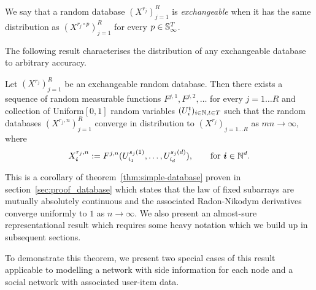 
\begin{definition}
We say that a random database $(X^{r_j})_{j=1}^R$ is \emph{exchangeable} when it has the same distribution as $(X^{r_j\circ p})_{j=1}^R$ for every $p \in \mathbb{S}_{\infty}^T$.
\end{definition}




The following result characterises the distribution of any exchangeable database to arbitrary accuracy.

\begin{cor}
  \label{cor:simple-database}
   Let $(X^{r_j})_{j=1}^R$ be an exchangeable random database.
   Then there exists a sequence of random measurable functions $F^{j,1}, F^{j,2}, \dotsc$ for 
   every $j=1\ldots R$ and collection of \iid Uniform$[0,1]$ random variables $(U^t_i)_{i\in\mathbb{N},t \in T}$ such that 
   the random databases $(X^{r_j,n})_{j=1}^R$
    converge in distribution to $(X^{r_j})_{j=1\ldots R}$ as $mn\to \infty$, where   
   \[
     X^{r_j,n}_{\bm{i}} := F^{j,n}(U^{s_j(1)}_{i_1},\dotsc,U^{s_j(d)}_{i_d}), \qquad \text{for } \bm{i} \in \mathbb{N}^d.
   \]
\end{cor}

This is a corollary of theorem~\ref{thm:simple-database} proven in section~\ref{sec:proof_database} which states that the law of fixed subarrays are mutually absolutely continuous and the associated Radon-Nikodym derivatives converge uniformly to $1$ as $n \to \infty$.
We also present an almost-sure representational result which requires some heavy notation which we build up in subsequent sections.

To demonstrate this theorem, we present two special cases of this result applicable to modelling a network with side information for each node and a social network with associated user-item data.

